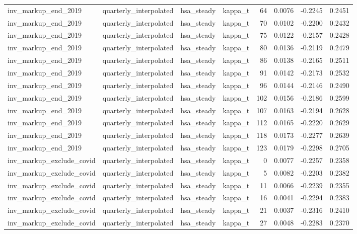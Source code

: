 \begin{tabular}{llllrrrr}
inv\_markup\_end\_2019 & quarterly\_interpolated & hsa\_steady & kappa\_t & 64 & 0.0076 & -0.2245 & 0.2451 \\
inv\_markup\_end\_2019 & quarterly\_interpolated & hsa\_steady & kappa\_t & 70 & 0.0102 & -0.2200 & 0.2432 \\
inv\_markup\_end\_2019 & quarterly\_interpolated & hsa\_steady & kappa\_t & 75 & 0.0122 & -0.2157 & 0.2428 \\
inv\_markup\_end\_2019 & quarterly\_interpolated & hsa\_steady & kappa\_t & 80 & 0.0136 & -0.2119 & 0.2479 \\
inv\_markup\_end\_2019 & quarterly\_interpolated & hsa\_steady & kappa\_t & 86 & 0.0138 & -0.2165 & 0.2511 \\
inv\_markup\_end\_2019 & quarterly\_interpolated & hsa\_steady & kappa\_t & 91 & 0.0142 & -0.2173 & 0.2532 \\
inv\_markup\_end\_2019 & quarterly\_interpolated & hsa\_steady & kappa\_t & 96 & 0.0144 & -0.2146 & 0.2490 \\
inv\_markup\_end\_2019 & quarterly\_interpolated & hsa\_steady & kappa\_t & 102 & 0.0156 & -0.2186 & 0.2599 \\
inv\_markup\_end\_2019 & quarterly\_interpolated & hsa\_steady & kappa\_t & 107 & 0.0163 & -0.2194 & 0.2628 \\
inv\_markup\_end\_2019 & quarterly\_interpolated & hsa\_steady & kappa\_t & 112 & 0.0165 & -0.2220 & 0.2629 \\
inv\_markup\_end\_2019 & quarterly\_interpolated & hsa\_steady & kappa\_t & 118 & 0.0173 & -0.2277 & 0.2639 \\
inv\_markup\_end\_2019 & quarterly\_interpolated & hsa\_steady & kappa\_t & 123 & 0.0179 & -0.2298 & 0.2705 \\
inv\_markup\_exclude\_covid & quarterly\_interpolated & hsa\_steady & kappa\_t & 0 & 0.0077 & -0.2257 & 0.2358 \\
inv\_markup\_exclude\_covid & quarterly\_interpolated & hsa\_steady & kappa\_t & 5 & 0.0082 & -0.2203 & 0.2382 \\
inv\_markup\_exclude\_covid & quarterly\_interpolated & hsa\_steady & kappa\_t & 11 & 0.0066 & -0.2239 & 0.2355 \\
inv\_markup\_exclude\_covid & quarterly\_interpolated & hsa\_steady & kappa\_t & 16 & 0.0041 & -0.2294 & 0.2383 \\
inv\_markup\_exclude\_covid & quarterly\_interpolated & hsa\_steady & kappa\_t & 21 & 0.0037 & -0.2316 & 0.2410 \\
inv\_markup\_exclude\_covid & quarterly\_interpolated & hsa\_steady & kappa\_t & 27 & 0.0048 & -0.2283 & 0.2370 \\

\end{tabular}
